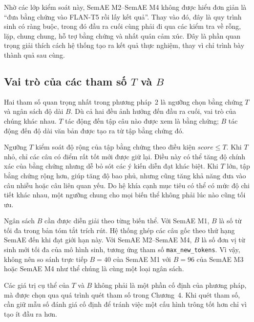 Nhờ các lớp kiểm soát này, SemAE M2--SemAE M4 không được hiểu đơn giản là ``đưa bằng chứng vào FLAN-T5 rồi lấy kết quả''. Thay vào đó, đây là quy trình sinh có ràng buộc, trong đó đầu ra cuối cùng phải đi qua các kiểm tra về rỗng, lặp, chung chung, hỗ trợ bằng chứng và nhất quán cảm xúc. Đây là phần quan trọng giải thích cách hệ thống tạo ra kết quả thực nghiệm, thay vì chỉ trình bày thành quả sau cùng.

\subsection{Vai trò của các tham số $T$ và $B$}
\label{subsec:method2-t-b}

Hai tham số quan trọng nhất trong phương pháp~2 là ngưỡng chọn bằng chứng \(T\) và ngân sách độ dài \(B\). Dù cả hai đều ảnh hưởng đến đầu ra cuối, vai trò của chúng khác nhau. \(T\) tác động đến tập câu nào được xem là bằng chứng; \(B\) tác động đến độ dài văn bản được tạo ra từ tập bằng chứng đó.

Ngưỡng \(T\) kiểm soát độ rộng của tập bằng chứng theo điều kiện \(score \leq T\). Khi \(T\) nhỏ, chỉ các câu có điểm rất tốt mới được giữ lại. Điều này có thể tăng độ chính xác của bằng chứng nhưng dễ bỏ sót các ý kiến diễn đạt khác biệt. Khi \(T\) lớn, tập bằng chứng rộng hơn, giúp tăng độ bao phủ, nhưng cũng tăng khả năng đưa vào câu nhiễu hoặc câu liên quan yếu. Do hệ khía cạnh mục tiêu có thể có mức độ chi tiết khác nhau, một ngưỡng chung cho mọi biến thể không phải lúc nào cũng tối ưu.

Ngân sách \(B\) cần được diễn giải theo từng biến thể. Với SemAE M1, \(B\) là số từ tối đa trong bản tóm tắt trích rút. Hệ thống ghép các câu gốc theo thứ hạng SemAE đến khi đạt giới hạn này. Với SemAE M2--SemAE M4, \(B\) là số đơn vị từ sinh mới tối đa của mô hình sinh, tương ứng tham số \texttt{max\_new\_tokens}. Vì vậy, không nên so sánh trực tiếp \(B=40\) của SemAE M1 với \(B=96\) của SemAE M3 hoặc SemAE M4 như thể chúng là cùng một loại ngân sách.

Các giá trị cụ thể của \(T\) và \(B\) không phải là một phần cố định của phương pháp, mà được chọn qua quá trình quét tham số trong Chương~4. Khi quét tham số, cần giữ mẫu số đánh giá cố định để tránh việc một cấu hình trông tốt hơn chỉ vì tạo ít đầu ra hơn.

